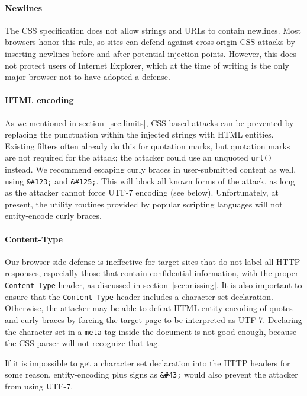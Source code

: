\documentclass{acm_proc_article-sp}
\begin{document}
\paragraph{Newlines}
The CSS specification does not allow strings and URLs to contain
newlines.  Most browsers honor this rule, so sites can defend against
cross-origin CSS attacks by inserting newlines before and after
potential injection points.  However, this does not protect users of
Internet Explorer, which at the time of writing is the only major
browser not to have adopted a defense.

\paragraph{HTML encoding}
As we mentioned in section~\ref{sec:limits}, CSS-based attacks can be
prevented by replacing the punctuation within the injected strings
with HTML entities.  Existing filters often already do this for
quotation marks, but quotation marks are not required for the attack;
the attacker could use an unquoted \texttt{url()} instead.  We
recommend escaping curly braces in user-submitted content as well,
using \verb|&#123;| and \verb|&#125;|.  This will block all known
forms of the attack, as long as the attacker cannot force UTF-7
encoding (see below).  Unfortunately, at present, the utility
routines provided by popular scripting languages will not
entity-encode curly braces.

\paragraph{Content-Type}
Our browser-side defense is ineffective for target sites that do not
label all HTTP responses, especially those that contain confidential
information, with the proper \texttt{Content-Type} header, as
discussed in section~\ref{sec:missing}.  It is also important to
ensure that the \texttt{Content-Type} header includes a character set
declaration.  Otherwise, the attacker may be able to defeat HTML
entity encoding of quotes and curly braces by forcing the target page
to be interpreted as UTF-7.  Declaring the character set in a
\texttt{meta} tag inside the document is not good enough, because the
CSS parser will not recognize that tag.

If it is impossible to get a character set declaration into the HTTP
headers for some reason, entity-encoding plus signs as \verb|&#43;|
would also prevent the attacker from using UTF-7.
\end{document}
